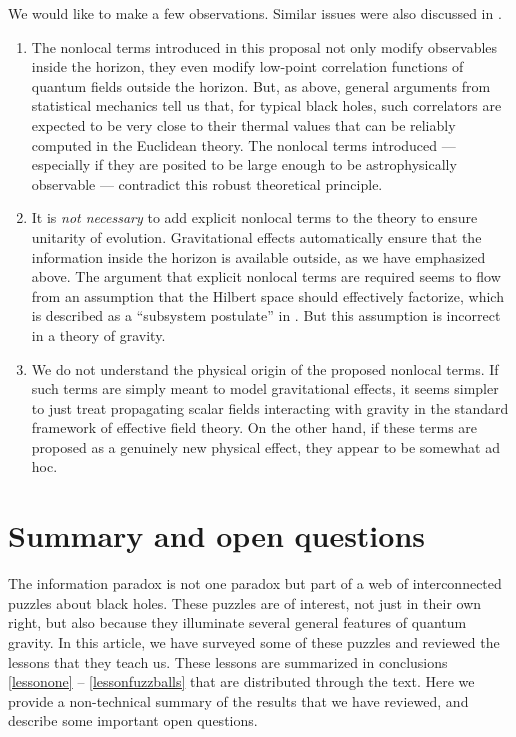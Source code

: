 \documentclass[12pt]{article}
\begin{document}
We would like to make a few observations.  Similar issues were also discussed in \cite{vijaythesis}.
\begin{enumerate}
\item
The nonlocal terms introduced in this proposal not only modify observables inside the horizon, they even modify 
low-point correlation functions of quantum fields outside the horizon.  But, as above, general arguments from statistical mechanics tell us that, for typical black holes, such correlators are expected to be very close to their thermal values that can be reliably computed in the Euclidean theory.   The nonlocal terms introduced --- especially if they are posited to be large enough to be astrophysically observable ---  contradict this robust theoretical principle.
\item
It is {\em not necessary} to add  explicit nonlocal terms to the theory to ensure unitarity of evolution.  Gravitational effects automatically ensure that the information inside the horizon is available outside, as we have emphasized above. The argument that explicit nonlocal terms are required seems to flow  from an assumption that the Hilbert space should 
effectively factorize, which is described as a ``subsystem postulate'' in \cite{Giddings:2017mym}. But this assumption is incorrect in a theory of gravity.
\item
We do not understand the physical origin of the proposed nonlocal terms. If such terms are simply meant to model gravitational effects, it seems simpler to just treat propagating scalar fields interacting with gravity in the standard framework of effective field theory. On the other hand, if these terms are proposed as a genuinely new physical effect, they appear to be somewhat ad hoc.
\end{enumerate}


\section{Summary and open questions}
The information paradox is not one paradox but part of a web of interconnected puzzles about black holes. These puzzles are of interest, not just
in their own right, but also because they illuminate several general features of quantum gravity. In this article, we have surveyed some of these puzzles and reviewed the lessons that they teach us. These lessons are summarized in conclusions \ref{lessonone} -- \ref{lessonfuzzballs} that are distributed through the text. Here we provide a non-technical summary of the results that we have reviewed, and describe some  important open questions.
 
\end{document}
